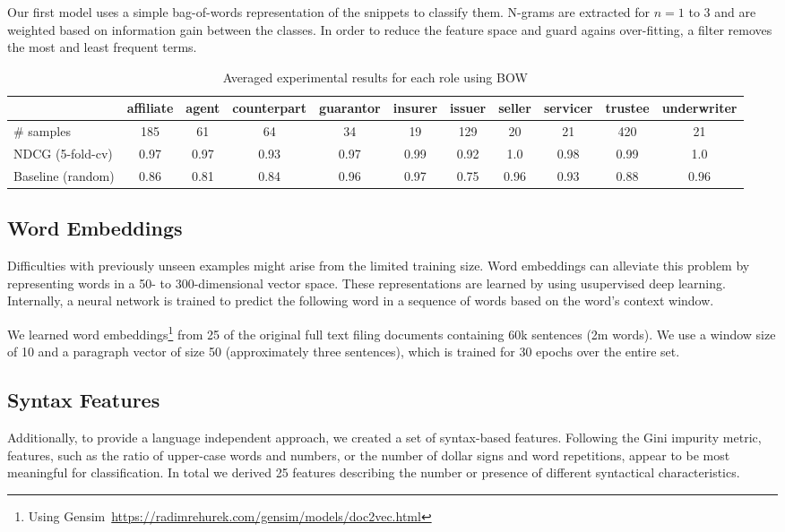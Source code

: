 Our first model uses a simple bag-of-words representation of the snippets to classify them.
N-grams are extracted for $n=1$ to $3$ and are weighted based on information gain between the classes.
In order to reduce the feature space and guard agains over-fitting, a filter removes the most and least frequent terms.

\begin{table*}[tb]
	\caption{Averaged experimental results for each role using BOW}
	\label{tab:roleresults}
	\begin{tabular}{lcccccccccc}
		\toprule
		& affiliate & agent & counterpart & guarantor & insurer & issuer & seller & servicer & trustee & underwriter \\
		\midrule
               \# samples        & 185  & 61   & 64   & 34   & 19   & 129  & 20   & 21   & 420  & 21   \\
               NDCG (5-fold-cv)   & 0.97 & 0.97 & 0.93 & 0.97 & 0.99 & 0.92 & 1.0  & 0.98 & 0.99 & 1.0  \\
               Baseline (random) & 0.86 & 0.81 & 0.84 & 0.96 & 0.97 & 0.75 & 0.96 & 0.93 & 0.88 & 0.96 \\
		\bottomrule
	\end{tabular}
\end{table*}

\subsection{Word Embeddings}
Difficulties with previously unseen examples might arise from the limited training size.
Word embeddings can alleviate this problem by representing words in a 50- to 300-dimensional vector space.
These representations are learned by using usupervised deep learning.
Internally, a neural network is trained to predict the following word in a sequence of words based on the word's context window. 

We learned word embeddings\footnote{Using Gensim~\url{https://radimrehurek.com/gensim/models/doc2vec.html}} from 25 of the original full text filing documents containing 60k sentences (2m words).
We use a window size of 10 and a paragraph vector of size 50 (approximately three sentences), which is trained for 30 epochs over the entire set.

\subsection{Syntax Features}
Additionally, to provide a language independent approach, we created a set of syntax-based features.
Following the Gini impurity metric, features, such as the ratio of upper-case words and numbers, or the number of dollar signs and word repetitions, appear to be most meaningful for classification.
In total we derived 25 features describing the number or presence of different syntactical characteristics.


